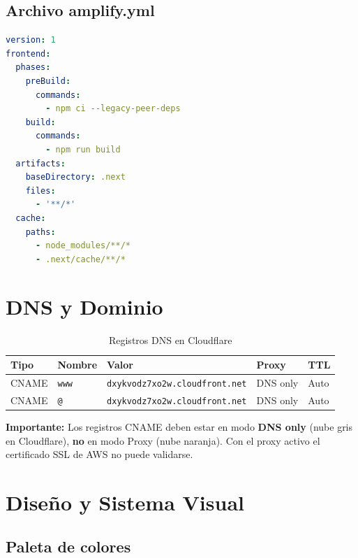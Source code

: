 \documentclass[12pt,a4paper]{article}
\begin{document}
\subsection{Archivo amplify.yml}

\begin{lstlisting}[language=yaml, caption={amplify.yml}]
version: 1
frontend:
  phases:
    preBuild:
      commands:
        - npm ci --legacy-peer-deps
    build:
      commands:
        - npm run build
  artifacts:
    baseDirectory: .next
    files:
      - '**/*'
  cache:
    paths:
      - node_modules/**/*
      - .next/cache/**/*
\end{lstlisting}

\section{DNS y Dominio}

\begin{table}[H]
\centering
\begin{tabular}{@{}lllll@{}}
\toprule
\textbf{Tipo} & \textbf{Nombre} & \textbf{Valor} & \textbf{Proxy} & \textbf{TTL} \\
\midrule
CNAME & \texttt{www} & \texttt{dxykvodz7xo2w.cloudfront.net} & DNS only & Auto \\
CNAME & \texttt{@} & \texttt{dxykvodz7xo2w.cloudfront.net} & DNS only & Auto \\
\bottomrule
\end{tabular}
\caption{Registros DNS en Cloudflare}
\end{table}

\begin{nexobox}
\textbf{Importante:} Los registros CNAME deben estar en modo \textbf{DNS only}
(nube gris en Cloudflare), \textbf{no} en modo Proxy (nube naranja). Con el proxy
activo el certificado SSL de AWS no puede validarse.
\end{nexobox}

\section{Diseño y Sistema Visual}

\subsection{Paleta de colores}
\end{document}
